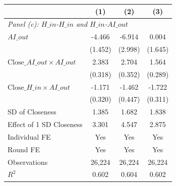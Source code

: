 \begin{table}[H]
\begin{threeparttable}
\begin{tabular}{l*{3}{c}}
\midrule
& (1) & (2) & (3) \\
\midrule
\multicolumn{4}{l}{\textit{Panel (c): $H\_{in}$-$H\_{in}$ and $H\_{in}$-$AI\_{out}$}} \\
\midrule
$AI\_{out}$  &      -4.466\sym{***}&      -6.914\sym{**} &       0.004         \\
            &     (1.452)         &     (2.998)         &     (1.645)         \\
\addlinespace
$\text{Close}\_{AI\_{out}} \times AI\_{out}$&       2.383\sym{***}&       2.704\sym{***}&       1.564\sym{***}\\
            &     (0.318)         &     (0.352)         &     (0.289)         \\
\addlinespace
$\text{Close}\_{H\_{in}} \times AI\_{out}$&      -1.171\sym{***}&      -1.462\sym{***}&      -1.722\sym{***}\\
            &     (0.320)         &     (0.447)         &     (0.311)         \\
\midrule
SD of Closeness&       1.385         &       1.682         &       1.838         \\
Effect of 1 SD Closeness&       3.301         &       4.547         &       2.875         \\
Individual FE&         Yes         &         Yes         &         Yes         \\
Round FE    &         Yes         &         Yes         &         Yes         \\
Observations&      26,224         &      26,224         &      26,224         \\
\(R^2\)     &       0.602         &       0.604         &       0.602         \\
\bottomrule\bottomrule
\end{tabular}
\end{threeparttable}
\end{table}
